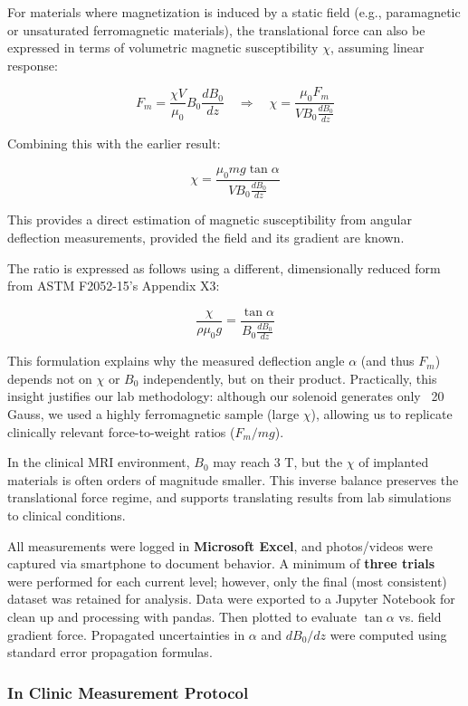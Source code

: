 For materials where magnetization is induced by a static field (e.g., paramagnetic or unsaturated ferromagnetic materials), the translational force can also be expressed in terms of volumetric magnetic susceptibility $\chi$, assuming linear response:

\begin{equation}
	F_m = \frac{\chi V}{\mu_0} B_0 \frac{dB_0}{dz}
	\quad \Rightarrow \quad
	\chi = \frac{\mu_0 F_m}{V B_0 \frac{dB_0}{dz}}
\end{equation}

Combining this with the earlier result:

\begin{equation}
	\chi = \frac{\mu_0 m g \tan \alpha}{V B_0 \frac{dB_0}{dz}}
\end{equation}

This provides a direct estimation of magnetic susceptibility from angular deflection measurements, provided the field and its gradient are known. 

The ratio is expressed as follows using a different, dimensionally reduced form from ASTM F2052-15's Appendix X3:

\begin{equation}
	\frac{\chi}{\rho \mu_0 g} = \frac{\tan \alpha}{B_0 \frac{dB_0}{dz}}
\end{equation}

This formulation explains why the measured deflection angle $\alpha$ (and thus $F_m$) depends not on $\chi$ or $B_0$ independently, but on their product. Practically, this insight justifies our lab methodology: although our solenoid generates only ~20 Gauss, we used a highly ferromagnetic sample (large $\chi$), allowing us to replicate clinically relevant force-to-weight ratios ($F_m / mg$).

In the clinical MRI environment, $B_0$ may reach 3 T, but the $\chi$ of implanted materials is often orders of magnitude smaller. This inverse balance preserves the translational force regime, and supports translating results from lab simulations to clinical conditions.


All measurements were logged in \textbf{Microsoft Excel}, and photos/videos were captured via smartphone to document behavior. A minimum of \textbf{three trials} were performed for each current level; however, only the final (most consistent) dataset was retained for analysis. Data were exported to a Jupyter Notebook for clean up and processing with pandas. Then plotted to evaluate $\tan \alpha$ vs. field gradient force. Propagated uncertainties in $\alpha$ and $dB_0/dz$ were computed using standard error propagation formulas.

\subsubsection{In Clinic Measurement Protocol}


